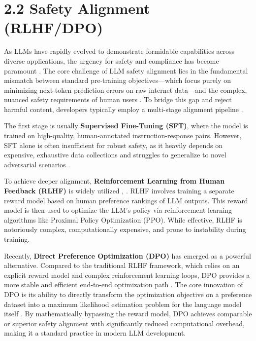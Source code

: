 \documentclass[11pt,a4paper]{article}
\begin{document}
\section{2.2 Safety Alignment (RLHF/DPO)}

As LLMs have rapidly evolved to demonstrate formidable capabilities across diverse applications, the urgency for safety and compliance has become paramount \cite{Cheng_2024_LLM}. The core challenge of LLM safety alignment lies in the fundamental mismatch between standard pre-training objectives---which focus purely on minimizing next-token prediction errors on raw internet data---and the complex, nuanced safety requirements of human users \cite{Cheng_2024_LLM}. To bridge this gap and reject harmful content, developers typically employ a multi-stage alignment pipeline \cite{Chen_2024_Rmcbench}.

The first stage is usually \textbf{Supervised Fine-Tuning (SFT)}, where the model is trained on high-quality, human-annotated instruction-response pairs. However, SFT alone is often insufficient for robust safety, as it heavily depends on expensive, exhaustive data collections and struggles to generalize to novel adversarial scenarios \cite{Liu_2025_Purpcode}. 

To achieve deeper alignment, \textbf{Reinforcement Learning from Human Feedback (RLHF)} is widely utilized \cite{Chen_2024_Rmcbench}, \cite{Liu_2025_Purpcode}. RLHF involves training a separate reward model based on human preference rankings of LLM outputs. This reward model is then used to optimize the LLM's policy via reinforcement learning algorithms like Proximal Policy Optimization (PPO). While effective, RLHF is notoriously complex, computationally expensive, and prone to instability during training.

Recently, \textbf{Direct Preference Optimization (DPO)} has emerged as a powerful alternative. Compared to the traditional RLHF framework, which relies on an explicit reward model and complex reinforcement learning loops, DPO provides a more stable and efficient end-to-end optimization path \cite{Yu_2025_LLMs}. The core innovation of DPO is its ability to directly transform the optimization objective on a preference dataset into a maximum likelihood estimation problem for the language model itself \cite{Yu_2025_LLMs}. By mathematically bypassing the reward model, DPO achieves comparable or superior safety alignment with significantly reduced computational overhead, making it a standard practice in modern LLM development.
\end{document}
